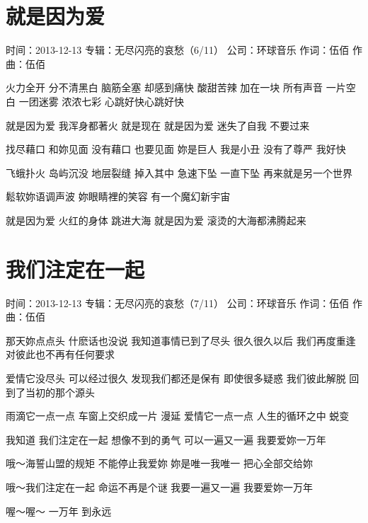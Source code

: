 \documentclass[UTF8,a4paper,oneside,twocolumn,12pt]{ctexbook}
\newcommand{\infopair}[2]{\textbullet #1：#2}
\newcommand{\zc}[1][伍佰]{\infopair{作词}{#1}}
\newcommand{\zq}[1][伍佰]{\infopair{作曲}{#1}}
\newcommand{\zj}[1]{\infopair{专辑}{#1}}
\newcommand{\sj}[1]{\infopair{时间}{#1}}
\newcommand{\gs}[1]{\infopair{公司}{#1}}
\newenvironment{info}{\begin{flushleft}\kaishu
	}
	{\end{flushleft}\normalsize\yahei\par}
\newenvironment{lyric}{
	}
{}
\begin{document}
\section{就是因为爱}
\begin{info}
	\sj{2013-12-13}
	\zj{无尽闪亮的哀愁（6/11）}
	\gs{环球音乐}
	\zc
	\zq
\end{info}
\begin{lyric}
	火力全开 分不清黑白
	脑筋全塞 却感到痛快
	酸甜苦辣 加在一块
	所有声音 一片空白
	一团迷雾 浓浓七彩
	心跳好快心跳好快

	就是因为爱
	我浑身都著火 就是现在
	就是因为爱
	迷失了自我 不要过来

	找尽藉口 和妳见面
	没有藉口 也要见面
	妳是巨人 我是小丑
	没有了尊严 我好快

	飞蛾扑火 岛屿沉没
	地层裂缝 掉入其中
	急速下坠 一直下坠
	再来就是另一个世界

	鬆软妳语调声波
	妳眼睛裡的笑容
	有一个魔幻新宇宙

	就是因为爱
	火红的身体 跳进大海
	就是因为爱
	滚烫的大海都沸腾起来
\end{lyric}

\section{我们注定在一起}
\begin{info}
	\sj{2013-12-13}
	\zj{无尽闪亮的哀愁（7/11）}
	\gs{环球音乐}
	\zc
	\zq
\end{info}
\begin{lyric}
	那天妳点点头 什麽话也没说
	我知道事情已到了尽头
	很久很久以后 我们再度重逢
	对彼此也不再有任何要求

	爱情它没尽头 可以经过很久
	发现我们都还是保有
	即使很多疑惑 我们彼此解脱
	回到了当初的那个源头

	雨滴它一点一点 车窗上交织成一片 漫延
	爱情它一点一点 人生的循环之中 蜕变

	我知道
	我们注定在一起 想像不到的勇气
	可以一遍又一遍 我要爱妳一万年

	哦～海誓山盟的规矩 不能停止我爱妳
	妳是唯一我唯一 把心全部交给妳

	哦～我们注定在一起 命运不再是个谜
	我要一遍又一遍 我要爱妳一万年

	喔～喔～
	一万年
	到永远
\end{lyric}
\end{document}
